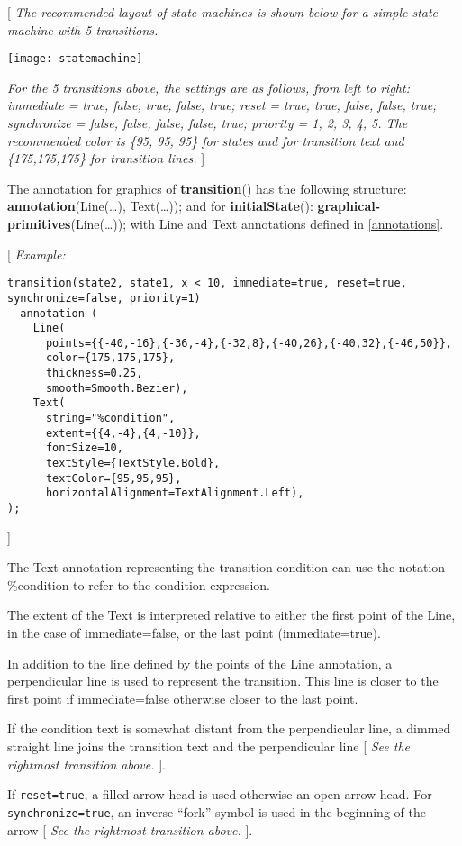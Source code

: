 {[} \emph{The recommended layout of state machines is shown below for a
simple state machine with 5 transitions. }

\texttt{[image: statemachine]}

\emph{For
the 5 transitions above, the settings are as follows, from left to
right: immediate = true, false, true, false, true; reset = true, true,
false, false, true; synchronize = false, false, false, false, true;
priority = 1, 2, 3, 4, 5. The recommended color is \{95, 95, 95\} for
states and for transition text and \{175,175,175\} for transition
lines.} {]}

The annotation for graphics of \textbf{transition}() has the following
structure: \textbf{annotation}(Line(\ldots{}), Text(\ldots{})); and for
\textbf{initialState}(): \textbf{graphical-primitives}(Line(\ldots{})); with Line
and Text annotations defined in \autoref{annotations}.

{[} \emph{Example:}
\begin{lstlisting}[language=modelica]
transition(state2, state1, x < 10, immediate=true, reset=true, synchronize=false, priority=1)
  annotation (
    Line(
      points={{-40,-16},{-36,-4},{-32,8},{-40,26},{-40,32},{-46,50}},
      color={175,175,175},
      thickness=0.25,
      smooth=Smooth.Bezier),
    Text(
      string="%condition",
      extent={{4,-4},{4,-10}},
      fontSize=10,
      textStyle={TextStyle.Bold},
      textColor={95,95,95},
      horizontalAlignment=TextAlignment.Left),
);
\end{lstlisting}
{]}

The Text annotation representing the transition condition can use the
notation \%condition to refer to the condition expression.

The extent of the Text is interpreted relative to either the first point
of the Line, in the case of immediate=false, or the last point
(immediate=true).

In addition to the line defined by the points of the Line annotation, a
perpendicular line is used to represent the transition. This line is
closer to the first point if immediate=false otherwise closer to the
last point.

If the condition text is somewhat distant from the perpendicular line, a
dimmed straight line joins the transition text and the perpendicular
line {[} \emph{See the rightmost transition above.} {]}.

If \lstinline!reset=true!, a filled arrow head is used otherwise an open arrow head.
For \lstinline!synchronize=true!, an inverse ``fork'' symbol is used in the
beginning of the arrow {[} \emph{See the rightmost transition above.}
{]}.

